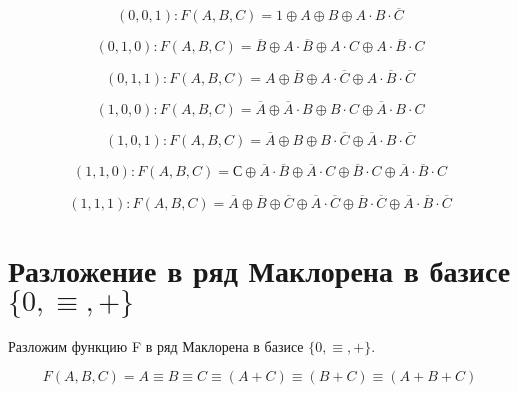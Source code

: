 \documentclass[a4paper,10pt]{article} %
\begin{document}
	\begin{equation}
	(0, 0, 1): F(A, B, C) = 1 \oplus A \oplus B \oplus 
	A \cdot B \cdot \overline{C}
	\end{equation}
	
	\begin{equation}
	(0, 1, 0): F(A, B, C) = \overline{B} \oplus A \cdot \overline{B}
	\oplus A \cdot C \oplus A \cdot \overline{B} \cdot C 
	\end{equation}
	
	\begin{equation}
	(0, 1, 1): F(A, B, C) = A \oplus \overline{B} \oplus A \cdot \overline{C} \oplus A \cdot \overline{B} \cdot \overline{C}
	\end{equation}
	
	\begin{equation}
	(1, 0, 0): F(A, B, C) = \overline{A} \oplus \overline{A} \cdot B
	 \oplus B \cdot C \oplus \overline{A} \cdot B \cdot C
	\end{equation}
	
	\begin{equation}
	(1, 0, 1): F(A, B, C) = \overline{A} \oplus B \oplus B \cdot \overline{C} 
	\oplus \overline{A} \cdot B \cdot \overline{C}
	\end{equation}
	
	\begin{equation}
	(1, 1, 0): F(A, B, C) = С \oplus \overline{A} \cdot \overline{B}
	 \oplus \overline{A} \cdot C \oplus \overline{B} \cdot C 
	 \oplus \overline{A} \cdot \overline{B} \cdot C
	\end{equation}
	
	\begin{equation}
	(1, 1, 1): F(A, B, C) = \overline{A} \oplus \overline{B} \oplus \overline{C} 
	\oplus \overline{A} \cdot \overline{C} \oplus \overline{B} \cdot \overline{C} \oplus \overline{A} \cdot \overline{B} \cdot \overline{C} 
	\end{equation}
	
	\section{Разложение в ряд Маклорена в базисе $\{0, \equiv, +\}$}
	Разложим функцию F в ряд Маклорена в базисе $\{0, \equiv, +\}$.
	
	\begin{equation}
	F(A, B, C) = A \equiv B \equiv C \equiv (A + C) 
	\equiv (B + C) \equiv (A + B + C)
	\end{equation}
	
\end{document}
